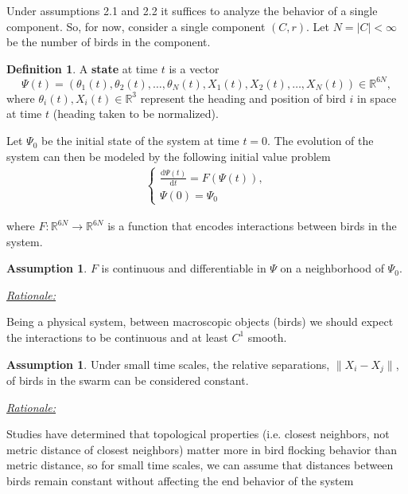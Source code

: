 \documentclass[11pt,a4paper]{article}
\numberwithin{equation}{section}
\newcommand{\R}{\mathbb{R}}
\theoremstyle{definition}
\newtheorem{definition}[theorem]{Definition}
\theoremstyle{assumption}
\newtheorem{assumption}[theorem]{Assumption}
\newenvironment{rationale}{%
  \par\vspace{0.5em}
  \noindent\hspace{1em}\begin{minipage}{\dimexpr\linewidth-2em}
  \underline{\textit{Rationale:}} 
}{%
  \end{minipage}
  \par\vspace{0.5em}
}
\begin{document}
Under assumptions 2.1 and 2.2 it suffices to analyze the behavior of a single component.
So, for now, consider a single component $(C,r)$. Let $N=|C|<\infty$ be the number
of birds in the component. 
\begin{definition}
    A \textbf{state} at time $t$ is a vector
    \[
        \Psi(t) = (\theta_1(t), \theta_2(t), \ldots, \theta_N(t), X_1(t), X_2(t), \ldots, X_N(t)) \in \R^{6N},
    \]
    where \(\theta_i(t), X_i(t) \in \mathbb{R}^3\) represent the heading and position of bird \(i\) in space at time $t$ (heading taken to be normalized).
\end{definition}

Let $\Psi_{0}$ be the initial state of the system at time $t=0$. 
The evolution of the system can then be modeled by the following initial value problem
\begin{align}
    \begin{cases}
    \displaystyle \frac{\mathrm{d}\Psi(t)}{\mathrm{d}t} = F(\Psi(t)),\\[6pt]
    \Psi(0) = \Psi_{0}
    \end{cases}
\end{align}

where $F: \R^{6N} \to \R^{6N}$ is a function that encodes interactions between birds in the system.

\begin{assumption}
    $F$ is continuous and differentiable in $\Psi$ on a neighborhood of $\Psi_0$.
    \begin{rationale}
        Being a physical system, between macroscopic objects (birds) we should
        expect the interactions to be continuous and at least $C^1$ smooth.
    \end{rationale}
\end{assumption}


\begin{assumption}
    Under small time scales, the relative separations, $\|X_i-X_j\|$, of birds
    in the swarm can be considered constant.
    \begin{rationale}
        Studies have determined that topological properties (i.e. closest neighbors, not metric distance of closest neighbors)
        matter more in bird flocking behavior than metric distance, so for small time scales, we can assume
        that distances between birds remain constant without affecting the end behavior of the system
        \cite{ballerini2008interaction}
    \end{rationale} 
\end{assumption}
\end{document}
